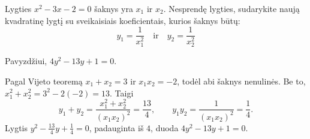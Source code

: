 \begin{salyga}
Lygties $x^2 - 3x - 2 = 0$ šaknys yra $x_1$ ir $x_2$. Nesprendę lygties, sudarykite naują kvadratinę lygtį su sveikaisiais koeficientais, kurios šaknys būtų:
    \[ y_1 = \frac{1}{x_1^2} \quad \text{ir} \quad y_2 = \frac{1}{x_2^2} \]
\end{salyga}

\begin{atsakymas}
Pavyzdžiui, $4y^2-13y+1=0$.
\end{atsakymas}

\begin{sprendimas}
Pagal Vijeto teoremą $x_1+x_2=3$ ir $x_1x_2=-2$, todėl abi šaknys nenulinės. Be to, $x_1^2+x_2^2=3^2-2(-2)=13$. Taigi
\[
y_1+y_2=\frac{x_1^2+x_2^2}{(x_1x_2)^2}=\frac{13}{4},
\qquad y_1y_2=\frac1{(x_1x_2)^2}=\frac14.
\]
Lygtis $y^2-\frac{13}{4}y+\frac14=0$, padauginta iš $4$, duoda $4y^2-13y+1=0$.
\end{sprendimas}
